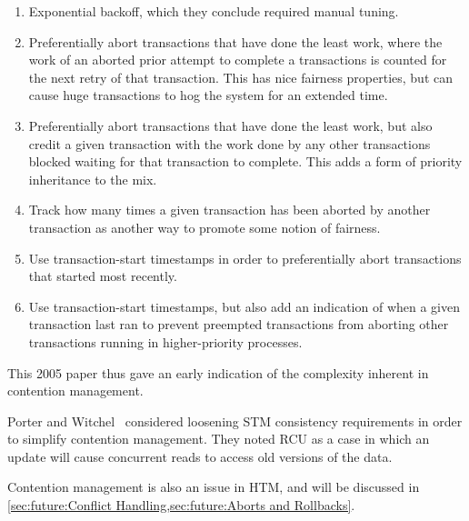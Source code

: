\begin{enumerate}
\item	Exponential backoff, which they conclude required manual
	tuning.
\item	Preferentially abort transactions that have done the least work,
	where the work of an aborted prior attempt to complete a
	transactions is counted for the next retry of that transaction.
	This has nice fairness properties, but can cause huge transactions
	to hog the system for an extended time.
\item	Preferentially abort transactions that have done the least work,
	but also credit a given transaction with the work done by any
	other transactions blocked waiting for that transaction to complete.
	This adds a form of priority inheritance to the mix.
\item	Track how many times a given transaction has been aborted by
	another transaction as another way to promote some notion of
	fairness.
\item	Use transaction-start timestamps in order to preferentially abort
	transactions that started most recently.
\item	Use transaction-start timestamps, but also add an indication
	of when a given transaction last ran to prevent preempted
	transactions from aborting other transactions running in
	higher-priority processes.
\end{enumerate}

This 2005 paper thus gave an early indication of the complexity inherent
in contention management.

Porter and Witchel~\cite{DonaldEPorter2007TRANSACT,Ramadan:2008:DTM:1521747.1521799}
considered loosening STM consistency requirements in order to simplify
contention management.
They noted RCU as a case in which an update will cause concurrent reads
to access old versions of the data.

Contention management is also an issue in HTM, and will be discussed
in \cref{sec:future:Conflict Handling,sec:future:Aborts and Rollbacks}.

\QuickQuizEnd

